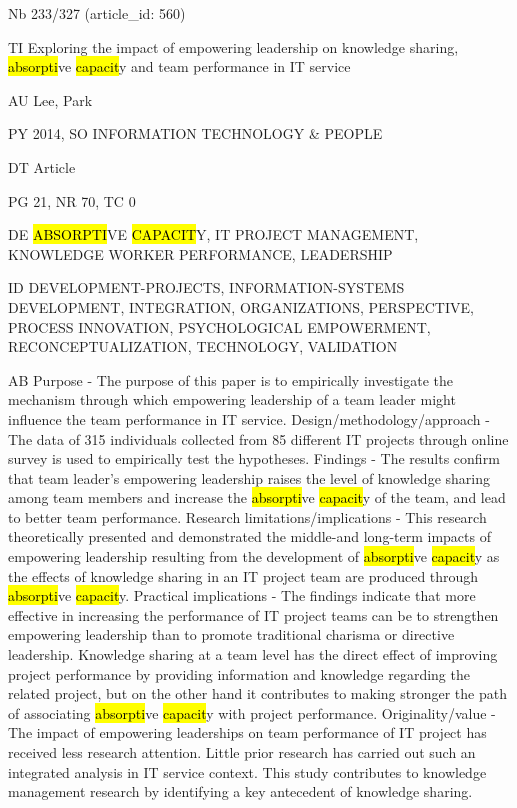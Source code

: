 \documentclass[a4paper]{article}
\begin{document}
\vspace*{-2cm}
Nb \tabto{0cm}233/327 (article\_id: 560)\par
TI \tabto{0cm}Exploring the impact of empowering leadership on knowledge sharing, \hl{absorpti}ve \hl{capacit}y and team performance in IT service\par
AU \tabto{0cm}Lee, Park\par
PY \tabto{0cm}2014, SO INFORMATION TECHNOLOGY \& PEOPLE\par
DT \tabto{0cm}Article\par
PG \tabto{0cm}21, NR 70, TC 0\par
DE \tabto{0cm}\hl{ABSORPTI}VE \hl{CAPACIT}Y, IT PROJECT MANAGEMENT, KNOWLEDGE WORKER PERFORMANCE, LEADERSHIP\par
ID \tabto{0cm}DEVELOPMENT-PROJECTS, INFORMATION-SYSTEMS DEVELOPMENT, INTEGRATION, ORGANIZATIONS, PERSPECTIVE, PROCESS INNOVATION, PSYCHOLOGICAL EMPOWERMENT, RECONCEPTUALIZATION, TECHNOLOGY, VALIDATION\par
AB \tabto{0cm}Purpose - The purpose of this paper is to empirically investigate the mechanism through which empowering leadership of a team leader might influence the team performance in IT service.
Design/methodology/approach - The data of 315 individuals collected from 85 different IT projects through online survey is used to empirically test the hypotheses.
Findings - The results confirm that team leader's empowering leadership raises the level of knowledge sharing among team members and increase the \hl{absorpti}ve \hl{capacit}y of the team, and lead to better team performance.
Research limitations/implications - This research theoretically presented and demonstrated the middle-and long-term impacts of empowering leadership resulting from the development of \hl{absorpti}ve \hl{capacit}y as the effects of knowledge sharing in an IT project team are produced through \hl{absorpti}ve \hl{capacit}y.
Practical implications - The findings indicate that more effective in increasing the performance of IT project teams can be to strengthen empowering leadership than to promote traditional charisma or directive leadership. Knowledge sharing at a team level has the direct effect of improving project performance by providing information and knowledge regarding the related project, but on the other hand it contributes to making stronger the path of associating \hl{absorpti}ve \hl{capacit}y with project performance.
Originality/value - The impact of empowering leaderships on team performance of IT project has received less research attention. Little prior research has carried out such an integrated analysis in IT service context. This study contributes to knowledge management research by identifying a key antecedent of knowledge sharing.\par
\clearpage
\end{document}
